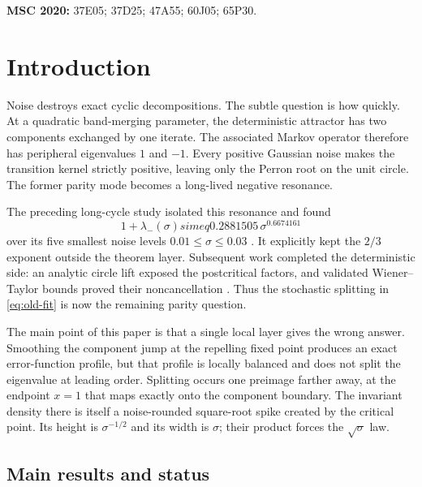 \documentclass[11pt]{article}
\theoremstyle{definition}
\theoremstyle{remark}
\begin{document}
\medskip
\noindent\textbf{MSC 2020:} 37E05; 37D25; 47A55; 60J05; 65P30.

\section{Introduction}
\label{sec:introduction}

Noise destroys exact cyclic decompositions.  The subtle question is how
quickly.  At a quadratic band-merging parameter, the deterministic attractor
has two components exchanged by one iterate.  The associated Markov operator
therefore has peripheral eigenvalues $1$ and $-1$.  Every positive Gaussian
noise makes the transition kernel strictly positive, leaving only the Perron
root on the unit circle.  The former parity mode becomes a long-lived negative
resonance.

The preceding long-cycle study isolated this resonance and found
\begin{equation}\label{eq:old-fit}
 1+\lambda_-(\sigma)simeq
 0.2881505\,\sigma^{0.6674161}
\end{equation}
over its five smallest noise levels
$0.01\le\sigma\le0.03$ \citep{WangLongCycle2026}.  It explicitly kept the
$2/3$ exponent outside the theorem layer.  Subsequent work completed the
deterministic side: an analytic circle lift exposed the postcritical factors,
and validated Wiener--Taylor bounds proved their noncancellation
\citep{WangPostcritical2026,WangValidatedGap2026}.  Thus the stochastic
splitting in \eqref{eq:old-fit} is now the remaining parity question.

The main point of this paper is that a single local layer gives the wrong
answer.  Smoothing the component jump at the repelling fixed point produces
an exact error-function profile, but that profile is locally balanced and
does not split the eigenvalue at leading order.  Splitting occurs one
preimage farther away, at the endpoint $x=1$ that maps exactly onto the
component boundary.  The invariant density there is itself a noise-rounded
square-root spike created by the critical point.  Its height is
$\sigma^{-1/2}$ and its width is $\sigma$; their product forces the
$\sqrt\sigma$ law.

\subsection*{Main results and status}
\end{document}
